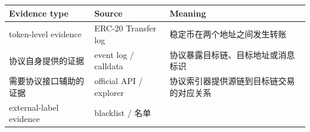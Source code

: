 \documentclass[12pt,a4paper]{ctexart}
\begin{document}
\begin{longtable}[]{@{}lll@{}}
\toprule
\begin{minipage}[b]{0.30\columnwidth}\raggedright
Evidence type\strut
\end{minipage} & \begin{minipage}[b]{0.30\columnwidth}\raggedright
Source\strut
\end{minipage} & \begin{minipage}[b]{0.30\columnwidth}\raggedright
Meaning\strut
\end{minipage}\tabularnewline
\midrule
\endhead
\begin{minipage}[t]{0.30\columnwidth}\raggedright
token-level evidence\strut
\end{minipage} & \begin{minipage}[t]{0.30\columnwidth}\raggedright
ERC-20 Transfer log\strut
\end{minipage} & \begin{minipage}[t]{0.30\columnwidth}\raggedright
稳定币在两个地址之间发生转账\strut
\end{minipage}\tabularnewline
\begin{minipage}[t]{0.30\columnwidth}\raggedright
协议自身提供的证据\strut
\end{minipage} & \begin{minipage}[t]{0.30\columnwidth}\raggedright
event log / calldata\strut
\end{minipage} & \begin{minipage}[t]{0.30\columnwidth}\raggedright
协议暴露目标链、目标地址或消息标识\strut
\end{minipage}\tabularnewline
\begin{minipage}[t]{0.30\columnwidth}\raggedright
需要协议接口辅助的证据\strut
\end{minipage} & \begin{minipage}[t]{0.30\columnwidth}\raggedright
official API / explorer\strut
\end{minipage} & \begin{minipage}[t]{0.30\columnwidth}\raggedright
协议索引器提供源链到目标链交易的对应关系\strut
\end{minipage}\tabularnewline
\begin{minipage}[t]{0.30\columnwidth}\raggedright
external-label evidence\strut
\end{minipage} & \begin{minipage}[t]{0.30\columnwidth}\raggedright
blacklist / 名单\strut
\end{minipage} & \begin{minipage}[t]{0.30\columnwidth}\raggedright

\end{minipage}
\end{longtable}
\end{document}
